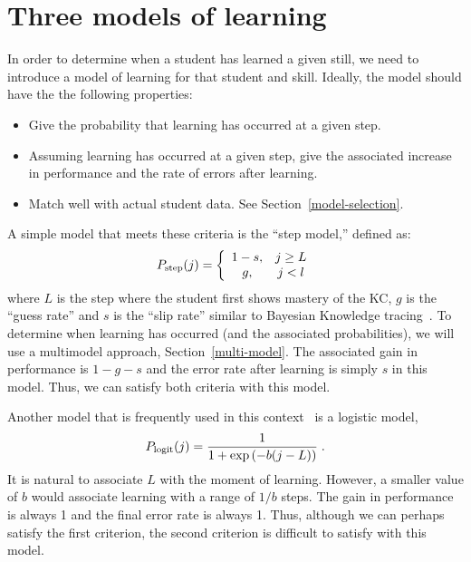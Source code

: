 \documentclass[11pt,letterpaper]{article}
\begin{document}
\section{Three models of learning}

In order to determine when a student has learned a given still,
we need to introduce a model of learning for that student and skill.
Ideally, the model should have the the following properties:
\begin{itemize}

\item Give the probability that learning has occurred at a given step.

\item  Assuming learning has occurred at a given step, give the 
     associated increase in performance and 
     the rate of errors after learning. \label{second}

\item Match well with actual student data.
      See Section~\ref{model-selection}.

\end{itemize}

A simple model that meets these criteria is the ``step model,'' defined
as:
\begin{equation}
    P_{\rm step}(j)= \left\{\begin{array}{cc}
                 1-s, & j\ge L \\
                 g, & j<l
                 \end{array} \right. 
\end{equation}
where $L$ is the step where the student first shows mastery of the
KC, $g$ is the ``guess rate'' and $s$ is the ``slip rate'' similar
to Bayesian Knowledge tracing~\cite{anderson}.  To determine
when learning has occurred (and the associated probabilities), 
we will use a multimodel approach, 
Section~\ref{multi-model}.  The associated gain in performance
is $1-g-s$ and the error rate after learning is simply $s$ in this
model.  Thus, we can satisfy both criteria with this model.

Another model that is frequently used in this context~\cite{logit} 
is a logistic model,
%
\begin{equation}
    P_{\rm logit}(j)= \frac{1}{1+\exp\left(-b (j-L)\right)} \; .
\end{equation}
%
It is natural to associate $L$ with the moment of learning.  However,
a smaller value of $b$ would associate learning with a range of 
$1/b$ steps.  The gain in performance is always 1 and the final error
rate is always 1.  Thus, although we can perhaps satisfy the first
criterion, the second criterion is difficult to satisfy with this model.
\end{document}
